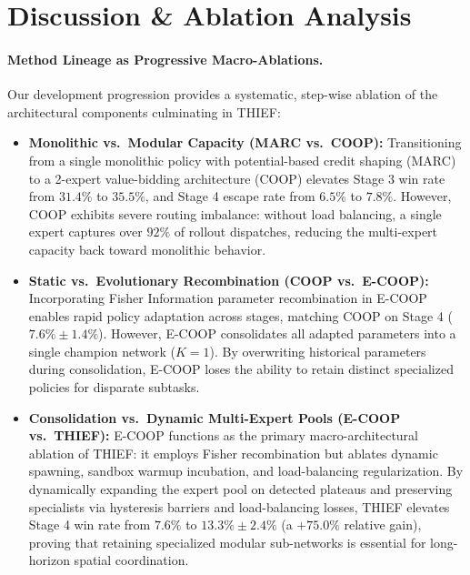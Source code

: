 \section{Discussion \& Ablation Analysis}
\label{sec:discussion}

\paragraph{Method Lineage as Progressive Macro-Ablations.}
Our development progression provides a systematic, step-wise ablation of the architectural components culminating in THIEF:
\begin{itemize}[leftmargin=*,nosep]
    \item \textbf{Monolithic vs.\ Modular Capacity (MARC vs.\ COOP):} Transitioning from a single monolithic policy with potential-based credit shaping (MARC) to a 2-expert value-bidding architecture (COOP) elevates Stage 3 win rate from $31.4\%$ to $35.5\%$, and Stage 4 escape rate from $6.5\%$ to $7.8\%$. However, COOP exhibits severe routing imbalance: without load balancing, a single expert captures over $92\%$ of rollout dispatches, reducing the multi-expert capacity back toward monolithic behavior.
    \item \textbf{Static vs.\ Evolutionary Recombination (COOP vs.\ E-COOP):} Incorporating Fisher Information parameter recombination in E-COOP enables rapid policy adaptation across stages, matching COOP on Stage 4 ($7.6\% \pm 1.4\%$). However, E-COOP consolidates all adapted parameters into a single champion network ($K=1$). By overwriting historical parameters during consolidation, E-COOP loses the ability to retain distinct specialized policies for disparate subtasks.
    \item \textbf{Consolidation vs.\ Dynamic Multi-Expert Pools (E-COOP vs.\ THIEF):} E-COOP functions as the primary macro-architectural ablation of THIEF: it employs Fisher recombination but ablates dynamic spawning, sandbox warmup incubation, and load-balancing regularization. By dynamically expanding the expert pool on detected plateaus and preserving specialists via hysteresis barriers and load-balancing losses, THIEF elevates Stage 4 win rate from $7.6\%$ to \textbf{$13.3\% \pm 2.4\%$} (a $+75.0\%$ relative gain), proving that retaining specialized modular sub-networks is essential for long-horizon spatial coordination.
\end{itemize}

